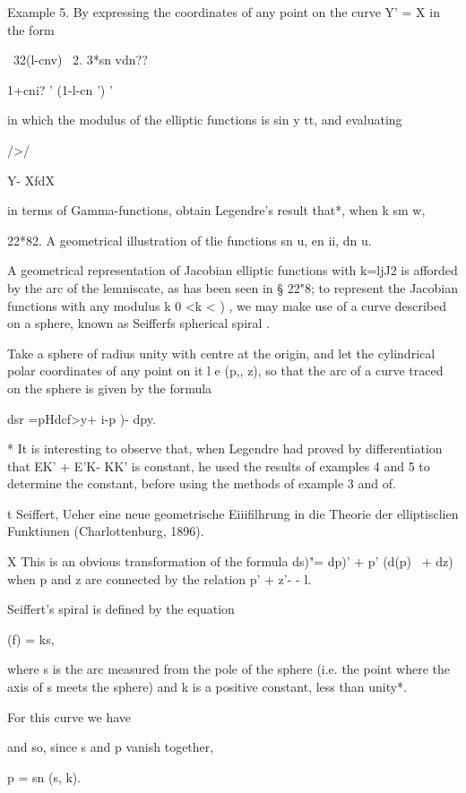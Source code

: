 Example 5. By expressing the coordinates of any point on the curve Y'
= X in the form

 \ 32(l-cnv) \ 2. 3*sn vdn??

1+cni? ' (1-l-cn ') '

in which the modulus of the elliptic functions is sin y tt, and
evaluating

 />/

Y- XfdX

in terms of Gamma-functions, obtain Legendre's result that*, when k sm
w,

22*82. A geometrical illustration of tlie functions sn u, en ii, dn u.

A geometrical representation of Jacobian elliptic functions with
k=ljJ2 is afforded by the arc of the lemniscate, as has been seen in §
22"8; to represent the Jacobian functions with any modulus k 0 <k < )
, we may make use of a curve described on a sphere, known as Seifferfs
spherical spiral .

Take a sphere of radius unity with centre at the origin, and let the
cylindrical polar coordinates of any point on it l e (p,, z), so that
the arc of a curve traced on the sphere is given by the formula \

 dsr =pHdcf>y+ i-p )- dpy.

* It is interesting to observe that, when Legendre had proved by
differentiation that EK' + E'K- KK' is constant, he used the results
of examples 4 and 5 to determine the constant, before using the
methods of example 3 and of.

t Seiffert, Ueher eine neue geometrische Eiiifilhrung in die Theorie
der elliptisclien Funktiunen (Charlottenburg, 1896).

X This is an obvious transformation of the formula ds)"= dp)' + p'
(d(p)~ + dz) when p and z are connected by the relation p' + z'- - l.

%
%

Seiffert's spiral is defined by the equation

(f) = ks,

where s is the arc measured from the pole of the sphere (i.e. the
point where the axis of s meets the sphere) and k is a positive
constant, less than unity*.

For this curve we have

and so, since s and p vanish together,

p = sn (s, k).

